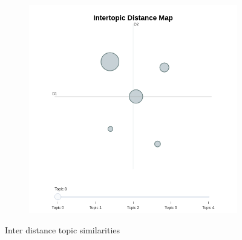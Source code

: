 \documentclass[sn-mathphys,Numbered]{sn-jnl}%
\theoremstyle{thmstyleone}%
\theoremstyle{thmstyletwo}%
\theoremstyle{thmstylethree}%
\begin{document}
\begin{figure}[h!]
\begin{subfigure}{0.45\textwidth}
    \includegraphics[width=\textwidth]{bertopic/combined_bertopic_topics_map_frequency.png}
    \label{twitterdist}
\end{subfigure}   
\caption{Inter distance topic similarities}
\label{redditdist_twitterdist}
\end{figure}
\end{document}
